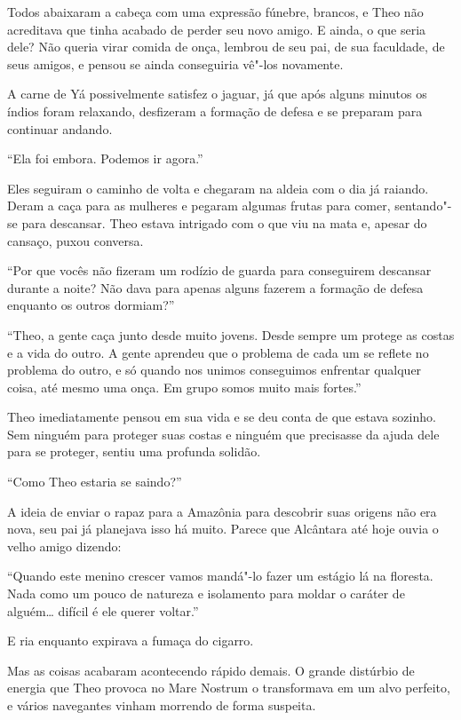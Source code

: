 Todos abaixaram a cabeça com uma expressão fúnebre, brancos, e Theo não
acreditava que tinha acabado de perder seu novo amigo. E ainda, o que
seria dele? Não queria virar comida de onça, lembrou de seu pai, de
sua faculdade, de seus amigos, e pensou se ainda conseguiria vê"-los
novamente.

A carne de Yá possivelmente satisfez o jaguar, já que após alguns
minutos os índios foram relaxando, desfizeram a formação de defesa e se
preparam para continuar andando.

``Ela foi embora. Podemos ir agora.''

Eles seguiram o caminho de volta e chegaram na aldeia com o dia já
raiando. Deram a caça para as mulheres e pegaram algumas frutas para
comer, sentando"-se para descansar. Theo estava intrigado com o que viu
na mata e, apesar do cansaço, puxou conversa.

``Por que vocês não fizeram um rodízio de guarda para conseguirem
descansar durante a noite? Não dava para apenas alguns fazerem a
formação de defesa enquanto os outros dormiam?''

``Theo, a gente caça junto desde muito jovens. Desde sempre um protege
as costas e a vida do outro. A gente aprendeu que o problema de cada um
se reflete no problema do outro, e só quando nos unimos conseguimos
enfrentar qualquer coisa, até mesmo uma onça. Em grupo somos muito mais
fortes.''

Theo imediatamente pensou em sua vida e se deu conta de que estava
sozinho. Sem ninguém para proteger suas costas e ninguém que precisasse
da ajuda dele para se proteger, sentiu uma profunda solidão.

\asterisc


``Como Theo estaria se saindo?''

A ideia de enviar o rapaz para a Amazônia para descobrir suas
origens não era nova, seu pai já planejava isso há muito. Parece que
Alcântara até hoje ouvia o velho amigo dizendo:

``Quando este menino crescer vamos mandá"-lo fazer um estágio
lá na floresta. Nada como um pouco de natureza e isolamento para moldar
o caráter de alguém\ldots{} difícil é ele querer voltar.''

E ria enquanto expirava a fumaça do cigarro.

Mas as coisas acabaram acontecendo rápido demais. O grande distúrbio
de energia que Theo provoca no Mare Nostrum o transformava em um alvo
perfeito, e vários navegantes vinham morrendo de forma suspeita.

